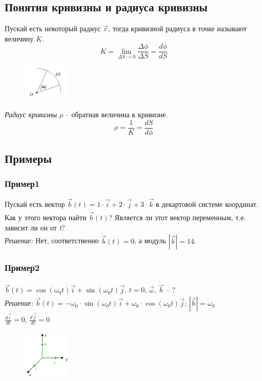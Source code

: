 \documentclass{article}
\begin{document}
  \subsection{Понятия кривизны и радиуса кривизны}

  \par Пускай есть некоторый радиус $\vec{r}$, тогда кривизной радиуса в точке называют величину $K$.
  $$K = \lim_{\Delta S \rightarrow 0}\frac{\Delta \phi}{\Delta S} = \frac{d\phi}{dS}$$
  \begin{figure}[H]
      \centering
    \includegraphics[width=0.2\textwidth]{image2_1.png}
  \end{figure}
  \textit{Радиус кривизны} $\rho$ -- обратная величина к кривизне.
  $$\rho = \frac{1}{K} = \frac{dS}{d\phi}$$

  \subsection{Примеры}
  \subsubsection*{Пример1}
  Пускай есть вектор $\vec{b}(t) = 1\cdot\vec{i}+2\cdot\vec{j}+3\cdot\vec{k}$ в декартовой системе координат. Как у этого вектора найти $\dot{\vec{b}}(t)$?
  Является ли этот вектор переменным, т.е. зависит ли он от \textit{t}?\\ 
  \textit{Решение:} Нет, соответственно $\dot{\vec{b}}(t) = 0$, а модуль $|\vec{b}| = 14$.\\
  \subsubsection*{Пример2}
  $\vec{b}(t) = \cos(\omega_{0}t)\vec{i}+\sin(\omega_{0}t)\vec{j}$. $t = 0$, $\vec{\omega}$, $\dot{\vec{b}}$ -- ?\\
  \textit{Решение:} $\dot{\vec{b}}(t) = -\omega_{0}\cdot\sin(\omega_{0}t)\vec{i}+\omega_{0}\cdot\cos(\omega_{0}t)\vec{j}$; $|\vec{b}| = \omega_{0}$\\
  $\frac{d\vec{i}}{dt} = 0$, $\frac{d\vec{j}}{dt} = 0$\\
  \begin{figure}[H]
      \centering
    \includegraphics[width=0.2\textwidth]{image2_3.png}
  \end{figure}
\end{document}

